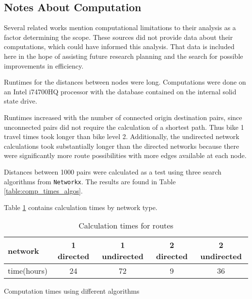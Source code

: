 \subsection{Notes About Computation}

Several related works mention computational limitations to their analysis as a factor determining the scope. These sources did not provide data about their computations, which could have informed this analysis. That data is included here in the hope of assisting future research planning and the search for possible improvements in efficiency. 

Runtimes for the distances between nodes were long. Computations were done on an Intel i74700HQ processor with the database contained on the internal solid state drive. 

Runtimes increased with the number of connected origin destination pairs, since unconnected pairs  did not require the calculation of a shortest path. Thus bike 1 travel times took longer than bike level 2. Additionally, the undirected network calculations took substantially longer than the directed networks because there were significantly more route possibilities with more edges available at each node. 

Distances between 1000 pairs were calculated as a test using three search algorithms from \texttt{Networkx}. The results are found in Table \ref{table:comp_times_algos}. 

Table \ref{table:net_calc_times} contains calculation times by network type. 

\begin{table}[]
\centering
\begin{tabular}{@{}lcccc@{}}
network     & 1 directed  & 1 undirected & 2 directed  & 2 undirected \\ 
\midrule
time(hours) & 24 & 72  & 9 & 36 \\ \bottomrule
\end{tabular}
\caption{Calculation times for routes}
\label{table:net_calc_times}
\end{table}

\begin{table}
\centering
\caption{Computation times using different algorithms}
\label{table:comp_times_algo}
\end{table}

